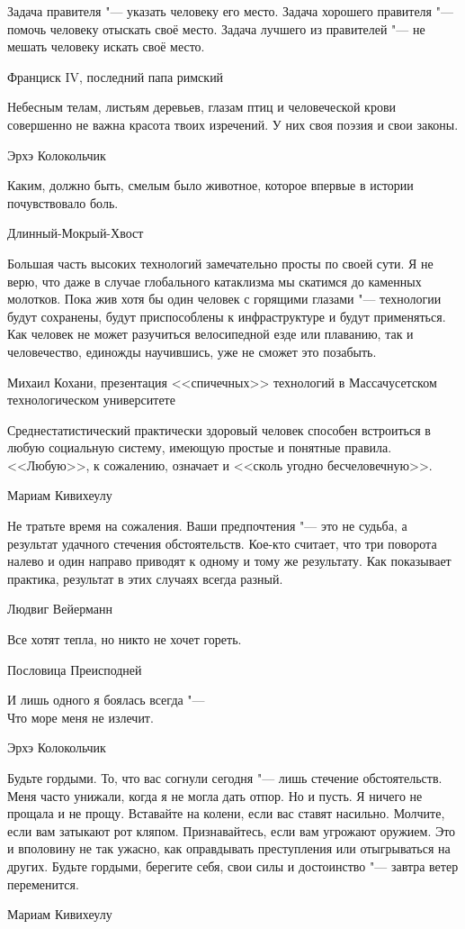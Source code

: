 \epigraph
{Задача правителя "--- указать человеку его место.
Задача хорошего правителя "--- помочь человеку отыскать своё место.
Задача лучшего из правителей "--- не мешать человеку искать своё место.}
{Франциск IV, последний папа римский}

\epigraph
{Небесным телам, листьям деревьев, глазам птиц и человеческой крови совершенно не важна красота твоих изречений.
У них своя поэзия и свои законы.}
{Эрхэ Колокольчик}

\epigraph
{Каким, должно быть, смелым было животное, которое впервые в истории почувствовало боль.}
{Длинный-Мокрый-Хвост}

\epigraph
{Большая часть высоких технологий замечательно просты по своей сути.
Я не верю, что даже в случае глобального катаклизма мы скатимся до каменных молотков.
Пока жив хотя бы один человек с горящими глазами "--- технологии будут сохранены, будут приспособлены к инфраструктуре и будут применяться.
Как человек не может разучиться велосипедной езде или плаванию, так и человечество, единожды научившись, уже не сможет это позабыть.}
{Михаил Кохани, презентация <<спичечных>> технологий в Массачусетском технологическом университете}

\epigraph
{Среднестатистический практически здоровый человек способен встроиться в любую социальную систему, имеющую простые и понятные правила.
<<Любую>>, к сожалению, означает и <<сколь угодно бесчеловечную>>.}
{Мариам Кивихеулу}

\epigraph
{Не тратьте время на сожаления.
Ваши предпочтения "--- это не судьба, а результат удачного стечения обстоятельств.
Кое-кто считает, что три поворота налево и один направо приводят к одному и тому же результату.
Как показывает практика, результат в этих случаях всегда разный.}
{Людвиг Вейерманн}

\epigraph
{Все хотят тепла, но никто не хочет гореть.}
{Пословица Преисподней}

\epigraph
{\ldotst И лишь одного я боялась всегда "---\\
Что море меня не излечит.}
{Эрхэ Колокольчик}

\epigraph
{Будьте гордыми.
То, что вас согнули сегодня "--- лишь стечение обстоятельств.
Меня часто унижали, когда я не могла дать отпор.
Но и пусть.
Я ничего не прощала и не прощу.
Вставайте на колени, если вас ставят насильно.
Молчите, если вам затыкают рот кляпом.
Признавайтесь, если вам угрожают оружием.
Это и вполовину не так ужасно, как оправдывать преступления или отыгрываться на других.
Будьте гордыми, берегите себя, свои силы и достоинство "--- завтра ветер переменится.}
{Мариам Кивихеулу}

